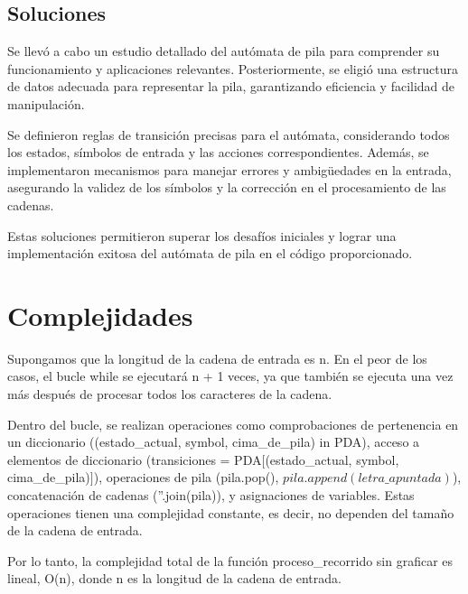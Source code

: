 \newline

\subsection{Soluciones}
Se llevó a cabo un estudio detallado del autómata de pila para comprender su funcionamiento y aplicaciones relevantes. Posteriormente, se eligió una estructura de datos adecuada para representar la pila, garantizando eficiencia y facilidad de manipulación.\newline

Se definieron reglas de transición precisas para el autómata, considerando todos los estados, símbolos de entrada y las acciones correspondientes. Además, se implementaron mecanismos para manejar errores y ambigüedades en la entrada, asegurando la validez de los símbolos y la corrección en el procesamiento de las cadenas.\newline

Estas soluciones permitieron superar los desafíos iniciales y lograr una implementación exitosa del autómata de pila en el código proporcionado.\newline 
\section{Complejidades}
Supongamos que la longitud de la cadena de entrada es n. En el peor de los casos, el bucle while se ejecutará n + 1 veces, ya que también se ejecuta una vez más después de procesar todos los caracteres de la cadena.\newline 

Dentro del bucle, se realizan operaciones como comprobaciones de pertenencia en un diccionario ((estado\_actual, symbol, cima\_de\_pila) in PDA), acceso a elementos de diccionario (transiciones = PDA$[$(estado\_actual, symbol, cima\_de\_pila)$]$), operaciones de pila (pila.pop(), $pila.append(letra\_apuntada)$), concatenación de cadenas (''.join(pila)), y asignaciones de variables. Estas operaciones tienen una complejidad constante, es decir, no dependen del tamaño de la cadena de entrada.\newline 

Por lo tanto, la complejidad total de la función proceso\_recorrido sin graficar es lineal, O(n), donde n es la longitud de la cadena de entrada.